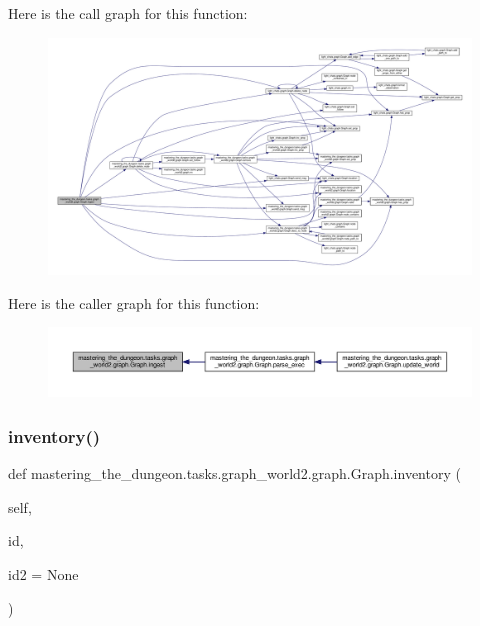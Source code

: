 Here is the call graph for this function\+:
\nopagebreak
\begin{figure}[H]
\begin{center}
\leavevmode
\includegraphics[width=350pt]{classmastering__the__dungeon_1_1tasks_1_1graph__world2_1_1graph_1_1Graph_ae7815030738f1dab61ff8f47de78442d_cgraph}
\end{center}
\end{figure}
Here is the caller graph for this function\+:
\nopagebreak
\begin{figure}[H]
\begin{center}
\leavevmode
\includegraphics[width=350pt]{classmastering__the__dungeon_1_1tasks_1_1graph__world2_1_1graph_1_1Graph_ae7815030738f1dab61ff8f47de78442d_icgraph}
\end{center}
\end{figure}
\mbox{\label{classmastering__the__dungeon_1_1tasks_1_1graph__world2_1_1graph_1_1Graph_a32f9d5878b445f63dc2bc2745a0ec104}} 
\subsubsection{\texorpdfstring{inventory()}{inventory()}}
{\footnotesize\ttfamily def mastering\+\_\+the\+\_\+dungeon.\+tasks.\+graph\+\_\+world2.\+graph.\+Graph.\+inventory (\begin{DoxyParamCaption}\item[{}]{self,  }\item[{}]{id,  }\item[{}]{id2 = {\ttfamily None} }\end{DoxyParamCaption})}



